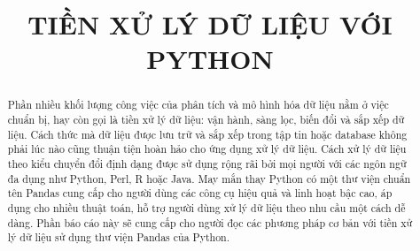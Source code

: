 \documentclass[12pt,a4paper,oneside]{book} %
\title{TIỀN XỬ LÝ DỮ LIỆU VỚI PYTHON}
\begin{document}

\coverpage

\frontmatter



\begin{abstract}
	Phần nhiều khối lượng công việc của phân tích và mô hình hóa dữ liệu nằm ở việc chuẩn bị, hay còn gọi là tiền xử lý dữ liệu: vận hành, sàng lọc, biến đổi và sắp xếp dữ liệu. Cách thức mà dữ liệu được lưu trữ và sắp xếp trong tập tin hoặc database không phải lúc nào cũng thuận tiện hoàn hảo cho ứng dụng xử lý dữ liệu.  Cách xử lý dữ liệu theo kiểu chuyển đổi định dạng được sử dụng rộng rãi bởi mọi người với các ngôn ngữ đa dụng như Python, Perl, R hoặc Java. May mắn thay Python có một thư viện chuẩn tên Pandas cung cấp cho người dùng các công cụ hiệu quả và linh hoạt bậc cao, áp dụng cho nhiều thuật toán, hỗ trợ người dùng xử lý dữ liệu theo nhu cầu một cách dễ dàng. Phần báo cáo này sẽ cung cấp cho người đọc các phương pháp cơ bản với tiền xử lý dữ liệu sử dụng thư viện Pandas của Python.
\end{abstract}	
	
\tableofcontents
\listoftables




\mainmatter

\fancyhead{}  %
\renewcommand{\footrulewidth}{0.4pt}

\pagestyle{fancy}  %







\nocite{*}
 
\end{document}
